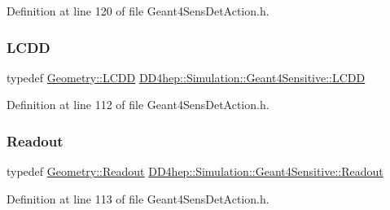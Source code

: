 Definition at line 120 of file Geant4\+Sens\+Det\+Action.\+h.

\hypertarget{class_d_d4hep_1_1_simulation_1_1_geant4_sensitive_a3373caa6917867ca7c871df20fb467c8}{}\label{class_d_d4hep_1_1_simulation_1_1_geant4_sensitive_a3373caa6917867ca7c871df20fb467c8} 
\subsubsection{\texorpdfstring{L\+C\+DD}{LCDD}}
{\footnotesize\ttfamily typedef \hyperlink{class_d_d4hep_1_1_geometry_1_1_l_c_d_d}{Geometry\+::\+L\+C\+DD} \hyperlink{class_d_d4hep_1_1_simulation_1_1_geant4_sensitive_a3373caa6917867ca7c871df20fb467c8}{D\+D4hep\+::\+Simulation\+::\+Geant4\+Sensitive\+::\+L\+C\+DD}}



Definition at line 112 of file Geant4\+Sens\+Det\+Action.\+h.

\hypertarget{class_d_d4hep_1_1_simulation_1_1_geant4_sensitive_a2dc0e9ab41aeebbb0bad179419eeac72}{}\label{class_d_d4hep_1_1_simulation_1_1_geant4_sensitive_a2dc0e9ab41aeebbb0bad179419eeac72} 
\subsubsection{\texorpdfstring{Readout}{Readout}}
{\footnotesize\ttfamily typedef \hyperlink{class_d_d4hep_1_1_geometry_1_1_readout}{Geometry\+::\+Readout} \hyperlink{class_d_d4hep_1_1_simulation_1_1_geant4_sensitive_a2dc0e9ab41aeebbb0bad179419eeac72}{D\+D4hep\+::\+Simulation\+::\+Geant4\+Sensitive\+::\+Readout}}



Definition at line 113 of file Geant4\+Sens\+Det\+Action.\+h.

\hypertarget{class_d_d4hep_1_1_simulation_1_1_geant4_sensitive_ac898770dc0c398f3b7b88d1bf5f72314}{}\label{class_d_d4hep_1_1_simulation_1_1_geant4_sensitive_ac898770dc0c398f3b7b88d1bf5f72314} 
